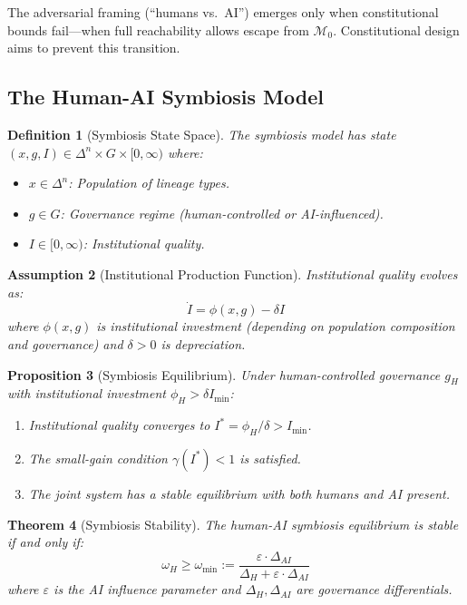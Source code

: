 \documentclass[12pt]{article}
\newtheorem{theorem}{Theorem}[section]
\newtheorem{proposition}[theorem]{Proposition}
\newtheorem{definition}[theorem]{Definition}
\newtheorem{assumption}[theorem]{Assumption}
\begin{document}
The adversarial framing (``humans vs.\ AI'') emerges only when constitutional bounds fail---when full reachability allows escape from $\mathcal{M}_0$. Constitutional design aims to prevent this transition.

\subsection{The Human-AI Symbiosis Model}

\begin{definition}[Symbiosis State Space]
The symbiosis model has state $(x, g, I) \in \Delta^n \times G \times [0, \infty)$ where:
\begin{itemize}
    \item $x \in \Delta^n$: Population of lineage types.
    \item $g \in G$: Governance regime (human-controlled or AI-influenced).
    \item $I \in [0, \infty)$: Institutional quality.
\end{itemize}
\end{definition}

\begin{assumption}[Institutional Production Function]
Institutional quality evolves as:
\[
\dot{I} = \phi(x, g) - \delta I
\]
where $\phi(x, g)$ is institutional investment (depending on population composition and governance) and $\delta > 0$ is depreciation.
\end{assumption}

\begin{proposition}[Symbiosis Equilibrium]
\label{prop:symbiosis-eq}
Under human-controlled governance $g_H$ with institutional investment $\phi_H > \delta I_{\min}$:
\begin{enumerate}
    \item Institutional quality converges to $I^* = \phi_H / \delta > I_{\min}$.
    \item The small-gain condition $\gamma(I^*) < 1$ is satisfied.
    \item The joint system has a stable equilibrium with both humans and AI present.
\end{enumerate}
\end{proposition}

\begin{theorem}[Symbiosis Stability]
\label{thm:symbiosis-stability}
The human-AI symbiosis equilibrium is stable if and only if:
\[
\omega_H \geq \omega_{\min} := \frac{\varepsilon \cdot \Delta_{AI}}{\Delta_H + \varepsilon \cdot \Delta_{AI}}
\]
where $\varepsilon$ is the AI influence parameter and $\Delta_H, \Delta_{AI}$ are governance differentials.
\end{theorem}
\end{document}

